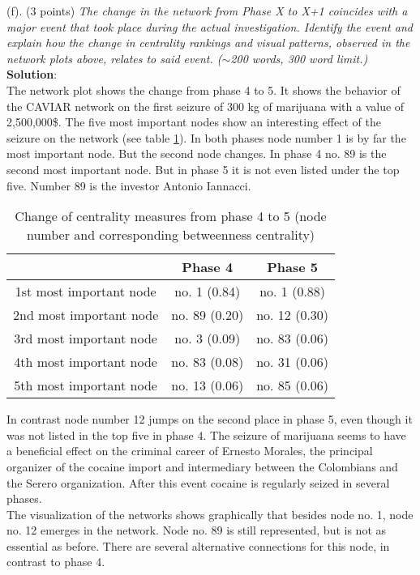 (f). (3 points) \textsl{The change in the network from Phase X to X+1 coincides with a major event that took place during the actual investigation. Identify the event and explain how the change in centrality rankings and visual patterns, observed in the network plots above, relates to said event. ($\sim$200 words, 300 word limit.)}\\

\textbf{Solution}:\\
The network plot shows the change from phase 4 to 5. It shows the behavior of the CAVIAR network on the first seizure of 300 kg of marijuana with a value of 2,500,000\$. The five most important nodes show an interesting effect of the seizure on the network (see table \ref{tab:centrality_phase_4_5}). In both phases node number 1 is by far the most important node. But the second node changes. In phase 4 no. 89 is the second most important node. But in phase 5 it is not even listed under the top five. Number 89 is the investor Antonio Iannacci.\\

\begin{table}[!h]
	\centering
	\begin{tabular}{|c|c|c|}
		\hline 
		 & Phase 4 & Phase 5 \\ 
		\hline 
		1st most important node & no. 1 (0.84) & no. 1 (0.88)  \\ 
		\hline 
		2nd most important node & no. 89 (0.20) & no. 12 (0.30) \\ 
		\hline 
		3rd most important node & no. 3 (0.09) & no. 83 (0.06) \\ 
		\hline 
		4th most important node & no. 83 (0.08) & no. 31 (0.06) \\ 
		\hline 
		5th most important node & no. 13 (0.06) & no. 85 (0.06) \\ 
		\hline 
	\end{tabular} 
	\caption{Change of centrality measures from phase 4 to 5 (node number and corresponding betweenness centrality)}
	\label{tab:centrality_phase_4_5}
\end{table}

In contrast node number 12 jumps on the second place in phase 5, even though it was not listed in the top five in phase 4. The seizure of marijuana seems to have a beneficial effect on the criminal career of Ernesto Morales, the principal organizer of the cocaine import and intermediary between the Colombians and the Serero organization. After this event cocaine is regularly seized in several phases.\\

The visualization of the networks shows graphically that besides node no. 1, node no. 12 emerges in the network. Node no. 89 is still represented, but is not as essential as before. There are several alternative connections for this node, in contrast to phase 4.\\